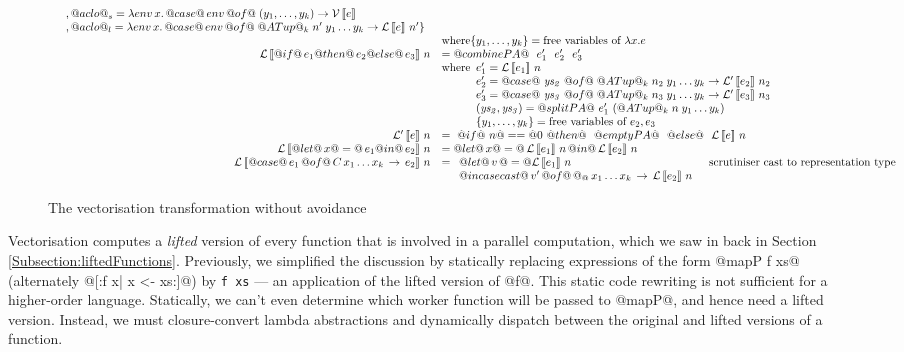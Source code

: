 \begin{figure*}
$$\begin{array}{c}
\begin{array}{rll}
{\begin{array}[t]{l}
        , @aclo@_s = \lambda env\,x.\,
           @case@\,env\,@of@\; (y_1,\dots,y_k) \to \VT{e} \\
        , @aclo@_l = \lambda env\,x.\,
           @case@\,env\,@of@\; @ATup@_k\; n'\; y_1 \dots y_k \to \LT{n'}{e} \}
     \end{array}} \\
 & \multicolumn{2}{l}{\mbox{where} \{y_1, \ldots, y_k\} = \mbox{free variables of $\lambda x.e$}} \\
\raisebox{0pt}[0.9\height][0.2\depth]{\LT{n}{@if@\,e_1
      @then@\,e_2 @else@\, e_3}} & = @combinePA@~~e_1'~~e_2'~~e_3' \\
& \multicolumn{2}{l}{\mbox{where}\begin{array}[t]{l}
 e_1' = \LT{n}{e_1} \\
 e_2' = @case@ ~\mathit{ys_2}~@of@ \; @ATup@_k\; n_2\; y_1 \dots y_k \to \LTprime{n_2}{e_2} \\
 e_3' = @case@ ~\mathit{ys_3}~@of@ \; @ATup@_k\; n_3\; y_1 \dots y_k \to \LTprime{n_3}{e_3} \\
 (\mathit{ys_2},\mathit{ys_3}) = @splitPA@~e_1'~ (@ATup@_k\; n\; y_1 \dots y_k) \\
 \{y_1, \ldots, y_k\} = \mbox{free variables of $e_2, e_3$} \\
 \end{array}}\\
\LTprime{n}{e} & \multicolumn{2}{l}{= ~ @if@~n@==@0~@then@~~@emptyPA@~~@else@~~\LT{n}{e}} \\
%
\LT{n}{@let@\, x @=@ \,e_1  @in@ \,e_2} & 
\multicolumn{2}{l}{= @let@\, x @=@ \,\LT{n}{e_1}\,@in@\,\LT{n}{e_2}} \\
%
\LT{n}{@case@\,e_1 \, @of@ \,C\,x_1 \ldots x_k \, \rightarrow \,e_2} & 
{= \begin{array}[t]{l}
    @let@\, v\, @=@ \LT{n}{e_1}\\
    @in case cast@\, v' \, @of@\, @_@ \,x_1 \ldots x_k\, \rightarrow \,\LT{n}{e_2}
    \end{array}
    } &\mbox{scrutiniser cast to representation type}
\end{array} \\
\end{array}$$
\caption{The vectorisation transformation without avoidance} 
\label{fig:vect}
\end{figure*}
%
Vectorisation computes a \emph{lifted} version of every function that is involved in a parallel computation, which we saw in back in Section \ref{Subsection:liftedFunctions}. Previously, we simplified the discussion by statically replacing expressions of the form @mapP f xs@  (alternately @[:f x| x <- xs:]@) by \texttt{f xs} --- an application of the lifted version of @f@. This static code rewriting is not sufficient for a higher-order language. Statically, we can't even determine which worker function will be passed to @mapP@, and hence need a lifted version. Instead, we must closure-convert lambda abstractions and dynamically dispatch between the original and lifted versions of a function.

